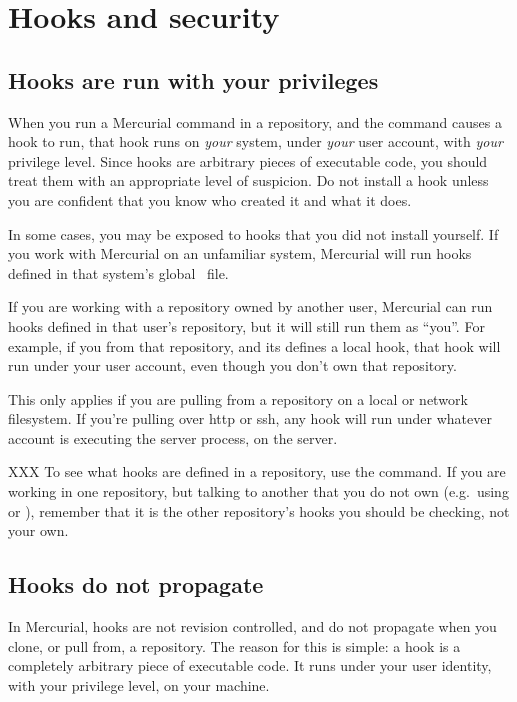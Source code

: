 \section{Hooks and security}

\subsection{Hooks are run with your privileges}

When you run a Mercurial command in a repository, and the command
causes a hook to run, that hook runs on \emph{your} system, under
\emph{your} user account, with \emph{your} privilege level.  Since
hooks are arbitrary pieces of executable code, you should treat them
with an appropriate level of suspicion.  Do not install a hook unless
you are confident that you know who created it and what it does.

In some cases, you may be exposed to hooks that you did not install
yourself.  If you work with Mercurial on an unfamiliar system,
Mercurial will run hooks defined in that system's global \hgrc\ file.

If you are working with a repository owned by another user, Mercurial
can run hooks defined in that user's repository, but it will still run
them as ``you''.  For example, if you  from that
repository, and its  defines a local
 hook, that hook will run under your user account, even
though you don't own that repository.

\begin{note}
  This only applies if you are pulling from a repository on a local or
  network filesystem.  If you're pulling over http or ssh, any
   hook will run under whatever account is executing
  the server process, on the server.
\end{note}

XXX To see what hooks are defined in a repository, use the
 command.  If you are working in one
repository, but talking to another that you do not own (e.g.~using
 or ), remember that it is the other
repository's hooks you should be checking, not your own.

\subsection{Hooks do not propagate}

In Mercurial, hooks are not revision controlled, and do not propagate
when you clone, or pull from, a repository.  The reason for this is
simple: a hook is a completely arbitrary piece of executable code.  It
runs under your user identity, with your privilege level, on your
machine.

